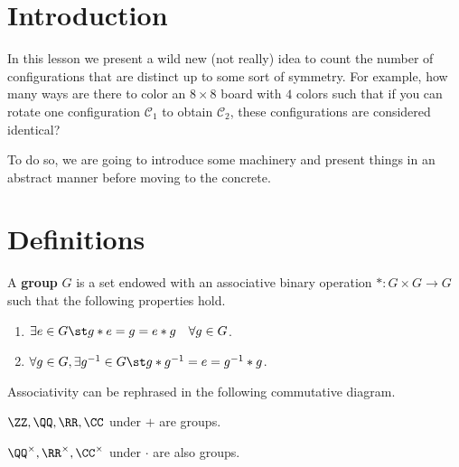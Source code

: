 \documentclass{article}
\begin{document}
\section{Introduction}
In this lesson we present a wild new (not really) idea to count the
number of configurations that are distinct up to some sort of symmetry.
For example, how many ways are there to color an $8 \times 8$ board with
$4$ colors such that if you can rotate one configuration $\mathcal{C}_1$
to obtain $\mathcal{C}_2$, these configurations are considered
identical?

To do so, we are going to introduce some machinery and present things in
an abstract manner before moving to the concrete.

\section{Definitions}
\begin{df}
A \textbf{group} $G$ is a set endowed with an associative binary
operation $* : G \times G \to G$ such that the following properties
hold.
\begin{enumerate}
\item $\exists e \in G \st g * e = g = e * g \quad \forall g \in G$.
\item $\forall g \in G, \exists g^{-1} \in G \st g * g^{-1} = e = g^{-1}
* g$.
\end{enumerate}
\end{df}

\begin{rem}
Associativity can be rephrased in the following commutative diagram.
\begin{center}
\end{center}
\end{rem}

\begin{ex}
$\ZZ, \QQ, \RR, \CC$ under $+$ are groups.
\end{ex}

\begin{ex}
$\QQ^\times, \RR^\times, \CC^\times$ under $\cdot$ are also groups.
\end{ex}
\end{document}
